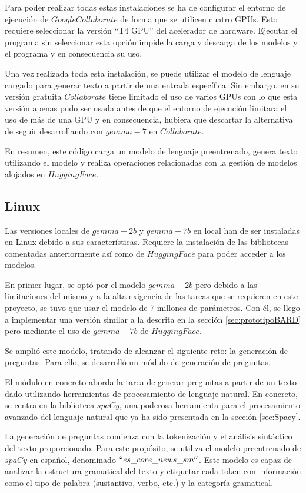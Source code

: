 Para poder realizar todas estas instalaciones se ha de configurar el entorno de ejecución de $Google Collaborate$ de forma que se utilicen cuatro GPUs. Esto requiere seleccionar la versión ``T4 GPU'' del acelerador de hardware. Ejecutar el programa sin seleccionar esta opción impide la carga y descarga de los modelos y el programa y en consecuencia su uso. 

Una vez realizada toda esta instalación, se puede utilizar el modelo de lenguaje cargado para generar texto a partir de una entrada específica. Sin embargo, en su versión gratuita $Collaborate$ tiene limitado el uso de varios GPUs con lo que esta versión apenas pudo ser usada antes de que el entorno de ejecución limitara el uso de más de una GPU y en consecuencia, hubiera que descartar la alternativa de seguir desarrollando con $gemma-7$ en $Collaborate$.

En resumen, este código carga un modelo de lenguaje preentrenado, genera texto utilizando el modelo y realiza operaciones relacionadas con la gestión de modelos alojados en $Hugging Face$.

\subsection{Linux}
Las versiones locales de $gemma-2b$ y $gemma-7b$ en local han de ser instaladas en Linux debido a sus características. Requiere la instalación de las bibliotecas comentadas anteriormente así como de $Hugging Face$ para poder acceder a los modelos. 

En primer lugar, se optó por el modelo $gemma-2b$ pero debido a las limitaciones del mismo y a la alta exigencia de las tareas que se requieren en este proyecto, se tuvo que usar el modelo de 7 millones de parámetros. Con él, se llego a implementar una versión similar a la descrita en la sección \ref{sec:prototipoBARD} pero mediante el uso de $gemma-7b$ de $Hugging Face$. 

Se amplió este modelo, tratando de alcanzar el siguiente reto: la generación de preguntas. Para ello, se desarrolló un módulo de generación de preguntas.

El módulo en concreto aborda la tarea de generar preguntas a partir de un texto dado utilizando herramientas de procesamiento de lenguaje natural. En concreto, se centra en la biblioteca $spaCy$, una poderosa herramienta para el procesamiento avanzado del lenguaje natural que ya ha sido presentada en la sección \ref{sec:Spacy}.

La generación de preguntas comienza con la tokenización y el análisis sintáctico del texto proporcionado. Para este propósito, se utiliza el modelo preentrenado de $spaCy$ en español, denominado \textit{$``es\_core\_news\_sm''$}. Este modelo es capaz de analizar la estructura gramatical del texto y etiquetar cada token con información como el tipo de palabra (sustantivo, verbo, etc.) y la categoría gramatical.

